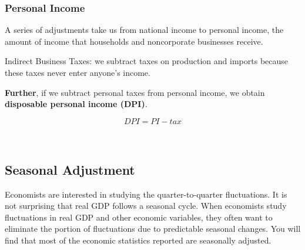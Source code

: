 \documentclass[12pt]{article}
\begin{document}
\subsubsection{Personal Income}
A series of adjustments take us from national income to personal income, the amount of 
income that households and noncorporate businesses receive.

\begin{figure}[H]
\end{figure}

Indirect Business Taxes: we subtract taxes on production and imports because these taxes
never enter anyone’s income.



{\textbf {Further}}, if we subtract personal taxes from personal income, we obtain
{\textbf {disposable personal income (DPI)}}.

\begin{equation*}
		DPI = PI - tax
\end{equation*}

\noindent{}\\




\subsection{Seasonal Adjustment}
Economists are interested in studying the quarter-to-quarter fluctuations. It is not 
surprising that real GDP follows a seasonal cycle.
When economists study fluctuations in real GDP and other economic variables,
they often want to eliminate the portion of fluctuations due to predictable seasonal 
changes. You will find that most of the economic statistics reported are seasonally 
adjusted.
\end{document}
